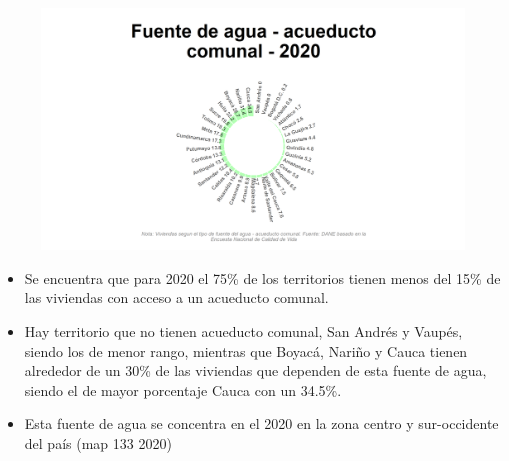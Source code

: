     \begin{figure}[H]
        \caption[Acueducto comunal como fuentes de agua por departamentos para 2020 ]{\label{cueducto_comunal_dptos} }
        \begin{center}
        \includegraphics[width=\textwidth,keepaspectratio]{img/var_133_static.png}
        \end{center}
    \end{figure}
            \begin{itemize}
                    \item Se encuentra que para 2020 el 75\% de los territorios tienen menos del 15\% de las viviendas con acceso a un acueducto comunal.
                    \item Hay territorio que no tienen acueducto comunal, San Andrés y Vaupés, siendo los de menor rango, mientras que Boyacá, Nariño y Cauca tienen alrededor de un 30\% de las viviendas que dependen de esta fuente de agua, siendo el de mayor porcentaje Cauca con un 34.5\%.
                    \item Esta fuente de agua se concentra en el 2020 en la zona centro y sur-occidente del país (map 133 2020)
                    \end{itemize}

